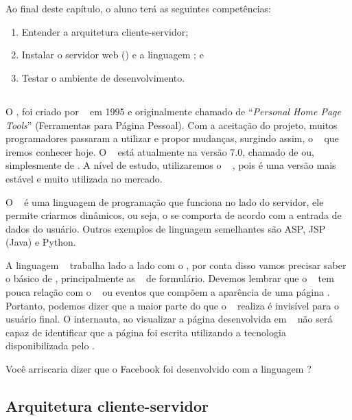 \chapter{\php}

Ao final deste capítulo, o aluno terá as seguintes competências:
\begin{enumerate}
	\item Entender a arquitetura cliente-servidor;
	\item Instalar o servidor web (\apache) e a linguagem \php; e
	\item Testar o ambiente de desenvolvimento. 
\end{enumerate}

\section{\phpcompleto}

O \phpcompleto, foi criado por \phpcriador~ em 1995 e originalmente chamado de 
“\textit{Personal Home Page Tools}” (Ferramentas para Página Pessoal). Com a 
aceitação do projeto, muitos programadores passaram a utilizar e propor mudanças,
surgindo assim, o \php~ que iremos conhecer hoje. O \php~ está atualmente na
versão 7.0, chamado de  ou, simplesmente de \php. A nível de estudo, 
utilizaremos o \php~ \phpversao, pois é uma versão mais estável e muito 
utilizada no mercado.

O \php~ é uma linguagem de programação que funciona no lado do servidor, 
ele permite criarmos \sites dinâmicos, ou seja, o \site se comporta de acordo 
com a entrada de dados do usuário. Outros exemplos de linguagem semelhantes são 
ASP, JSP (Java) e Python.

A linguagem \php~ trabalha lado a lado com o \htmlcompleto, por conta disso vamos
precisar saber o básico de \html, principalmente as \tags~ de formulário. Devemos
lembrar que o \php~ tem pouca relação com o \layout~ ou eventos que compõem a 
aparência de uma página \web. Portanto, podemos dizer que a maior parte do que o
\php~ realiza é invisível para o usuário final. O internauta, ao visualizar a 
página desenvolvida em \php~ não será capaz de identificar que a página foi 
escrita utilizando a tecnologia disponibilizada pelo \php. 

Você arriscaria dizer que o Facebook foi desenvolvido com a linguagem \php?

\section{Arquitetura cliente-servidor}
\label{arquitetura-cliente-servidor}

